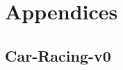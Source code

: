 \documentclass{article}
\begin{document}








\section{Appendices}
\subsection{Car-Racing-v0}
\end{document}
